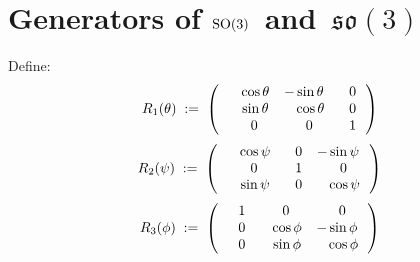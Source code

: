 
\section{Generators of \;$\textnormal{SO}(3)$\, and \,$\mathfrak{so}(3)$}


\vskip 0.1cm
\noindent
Define:
\begin{equation*}
R_{1}(\theta)
\; := \;
	\left(\,
		\begin{array}{ccc}
			{\color{white}-}\cos\theta & -\sin\theta & {\color{white}-}0 \\
			{\color{white}-}\sin\theta & {\color{white}-}\cos\theta & {\color{white}-}0 \\
			{\color{white}-}0 & {\color{white}-}0 & {\color{white}-}1 \\
			\end{array}
		\,\right)
\end{equation*}
\begin{equation*}
R_{2}(\psi)
\; := \;
	\left(\,
		\begin{array}{ccc}
			{\color{white}-}\cos\psi & {\color{white}-}0 & {\color{black}-}\sin\psi \\
			{\color{white}-}0 & {\color{white}-}1 & {\color{white}-}0 \\
			{\color{white}-}\sin\psi & {\color{white}-}0 & {\color{white}-}\cos\psi \\
			\end{array}
		\,\right)
\end{equation*}
\begin{equation*}
R_{3}(\phi)
\; := \;
	\left(\,
		\begin{array}{ccc}
			{\color{white}-}1 & {\color{white}-}0 & {\color{white}-}0 \\
			{\color{white}-}0 & {\color{white}-}\cos\phi & -\sin\phi \\
			{\color{white}-}0 & {\color{white}-}\sin\phi & {\color{white}-}\cos\phi \\
			\end{array}
		\,\right)
\end{equation*}



